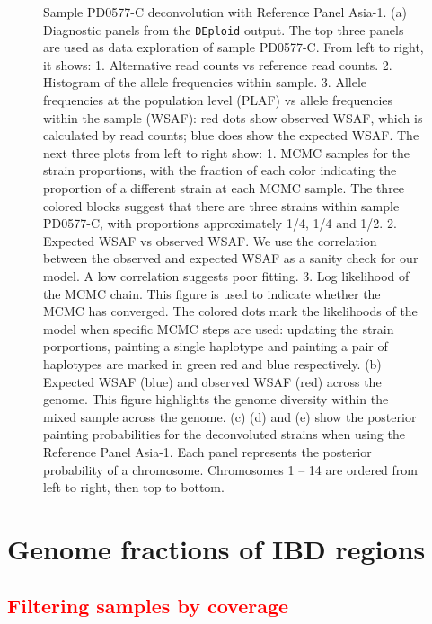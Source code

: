 \documentclass{article}
\begin{document}
\begin{figure}[ht]
\centering
\caption{Sample {\textmd PD0577-C} deconvolution with Reference Panel Asia-1. (a) Diagnostic panels from the \texttt{DEploid} output. The top three panels are used as data exploration of sample {\textmd PD0577-C}. From left to right, it shows: 1. Alternative read counts vs reference read counts. 2. Histogram of the allele frequencies within sample.
3. Allele frequencies at the population level (PLAF) vs allele frequencies within the sample (WSAF): red dots show observed WSAF, which is calculated by read counts; blue does show the expected WSAF. The next three plots from left to right show: 1. MCMC samples for the strain proportions, with the fraction of each color indicating the proportion of a different strain at each MCMC sample. The three colored blocks suggest that there are three strains within sample {\textmd PD0577-C}, with proportions approximately 1/4, 1/4 and 1/2.
2. Expected WSAF vs observed WSAF. We use the correlation between the observed and expected WSAF as a sanity check for our model. A low correlation suggests poor fitting.
3. Log likelihood of the MCMC chain. This figure is used to indicate whether the MCMC has converged. The colored dots mark the likelihoods of the model when specific MCMC steps are used: updating the strain porportions, painting a single haplotype and painting a pair of haplotypes are marked in green red and blue respectively. (b) Expected WSAF (blue) and observed WSAF (red) across the genome. This figure highlights the genome diversity within the mixed sample across the genome. (c) (d) and (e) show the posterior painting probabilities for the deconvoluted strains when using the Reference Panel Asia-1. Each panel represents the posterior probability of a chromosome. Chromosomes 1 -- 14 are ordered from left to right, then top to bottom.
}\label{fig:PD0577}
\end{figure}




\newpage


\section{Genome fractions of IBD regions}

\subsection{\textcolor{red}{Filtering samples by coverage}}
\end{document}
